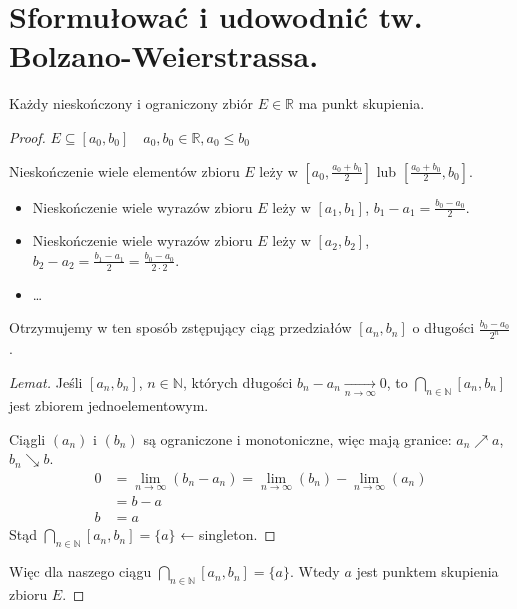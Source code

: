 \documentclass{article}
\numberwithin{equation}{section}
\theoremstyle{definition}
\theoremstyle{case}
\newcommand*{\R}{\mathbb{R}}
\newcommand*{\N}{\mathbb{N}}
\begin{document}
\section{Sformułować i udowodnić tw. Bolzano-Weierstrassa.}
Każdy nieskończony i ograniczony zbiór $E\in\R$ ma punkt skupienia.
\begin{proof}
	$E\subseteq[a_0,b_0] \quad a_0,b_0 \in\R, a_0 \leq b_0$

	Nieskończenie wiele elementów zbioru $E$ leży w $\left[a_0,\frac{a_0+b_0}{2}\right]$ lub $\left[\frac{a_0+b_0}{2},b_0\right]$.
	\begin{itemize}
		\item Nieskończenie wiele wyrazów zbioru $E$ leży w $[a_1,b_1]$, $b_1-a_1=\frac{b_0-a_0}{2}$.
		\item Nieskończenie wiele wyrazów zbioru $E$ leży w $[a_2,b_2]$, $b_2-a_2=\frac{b_1-a_1}{2}=\frac{b_0-a_0}{2\cdot2}$.
		\item \dots
	\end{itemize}
	Otrzymujemy w ten sposób zstępujący ciąg przedziałów $[a_n,b_n]$ o długości $\frac{b_0-a_0}{2^n}$.

	\begin{proof}[Lemat]
		Jeśli $[a_n,b_n]$, $n\in\N$, których długości $b_n-a_n \xrightarrow[n\to\infty]{} 0$, to
	$\bigcap\limits_{n\in\N}[a_n,b_n]$ jest zbiorem jednoelementowym.

	Ciągli $(a_n)$ i $(b_n)$ są ograniczone i monotoniczne, więc mają granice: $a_n\nearrow a$, $b_n\searrow b$.
	\begin{align*}
		0 & = \lim_{n\to\infty}(b_n-a_n) = \lim_{n\to\infty}(b_n)-\lim_{n\to\infty}(a_n)
		\\ &= b-a
		\\ b &= a
	\end{align*}
	Stąd $\displaystyle\bigcap\limits_{n\in\N}[a_n,b_n] = \{a\}$ ← singleton.
	\end{proof}

	Więc dla naszego ciągu $\displaystyle\bigcap\limits_{n\in\N}[a_n,b_n] = \{a\}$. Wtedy $a$ jest punktem skupienia zbioru $E$.
\end{proof}
\end{document}
